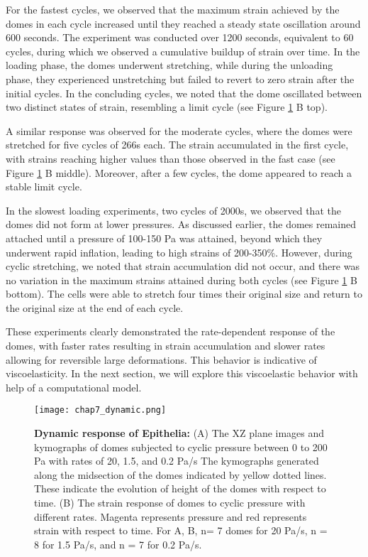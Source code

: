For the fastest cycles, we observed that the maximum strain achieved by the domes in each cycle increased until they reached a steady state oscillation around 600 seconds. The experiment was conducted over 1200 seconds, equivalent to 60 cycles, during which we observed a cumulative buildup of strain over time. In the loading phase, the domes underwent stretching, while during the unloading phase, they experienced unstretching but failed to revert to zero strain after the initial cycles. In the concluding cycles, we noted that the dome oscillated between two distinct states of strain, resembling a limit cycle (see Figure \ref{fig_7_6} B top).

A similar response was observed for the moderate cycles, where the domes were stretched for five cycles of 266s each. The strain accumulated in the first cycle, with strains reaching higher values than those observed in the fast case (see Figure \ref{fig_7_6} B middle). Moreover, after a few cycles, the dome appeared to reach a stable limit cycle.

In the slowest loading experiments, two cycles of 2000s, we observed that the domes did not form at lower pressures. As discussed earlier, the domes remained attached until a pressure of 100-150 Pa was attained, beyond which they underwent rapid inflation, leading to high strains of 200-350\%. However, during cyclic stretching, we noted that strain accumulation did not occur, and there was no variation in the maximum strains attained during both cycles (see Figure \ref{fig_7_6} B bottom). The cells were able to stretch four times their original size and return to the original size at the end of each cycle.

These experiments clearly demonstrated the rate-dependent response of the domes, with faster rates resulting in strain accumulation and slower rates allowing for reversible large deformations. This behavior is indicative of viscoelasticity. In the next section, we will explore this viscoelastic behavior with help of a computational model.

\begin{figure}[]
	\centering
	\texttt{[image: chap7\_dynamic.png]}
	\caption{\label{fig_7_6} \textbf{Dynamic response of Epithelia:} (A) The XZ plane images and kymographs of domes subjected to cyclic pressure between 0 to 200 Pa with rates of 20, 1.5, and 0.2 Pa/s The kymographs generated along the midsection of the domes indicated by yellow dotted lines. These indicate the evolution of height of the domes with respect to time. (B) The strain response of domes to cyclic pressure with different rates. Magenta represents pressure and red represents strain with respect to time. For A, B, n= 7 domes for 20 Pa/s, n = 8 for 1.5 Pa/s, and n = 7 for 0.2 Pa/s. 
	}
\end{figure}

